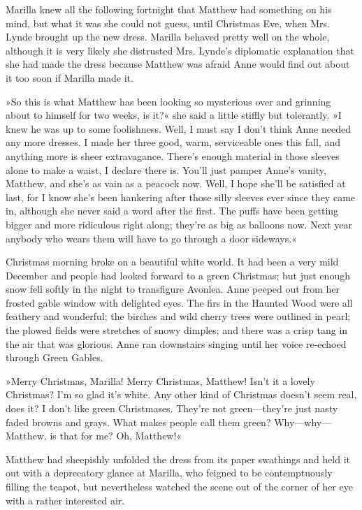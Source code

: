 Marilla knew all the following fortnight that Matthew had something on his mind, but what it was she could not guess, until Christmas Eve, when Mrs. Lynde brought up the new dress. Marilla behaved pretty well on the whole, although it is very likely she distrusted Mrs. Lynde's diplomatic explanation that she had made the dress because Matthew was afraid Anne would find out about it too soon if Marilla made it.

»So this is what Matthew has been looking so mysterious over and grinning about to himself for two weeks, is it?« she said a little stiffly but tolerantly. »I knew he was up to some foolishness. Well, I must say I don't think Anne needed any more dresses. I made her three good, warm, serviceable ones this fall, and anything more is sheer extravagance. There's enough material in those sleeves alone to make a waist, I declare there is. You'll just pamper Anne's vanity, Matthew, and she's as vain as a peacock now. Well, I hope she'll be satisfied at last, for I know she's been hankering after those silly sleeves ever since they came in, although she never said a word after the first. The puffs have been getting bigger and more ridiculous right along; they're as big as balloons now. Next year anybody who wears them will have to go through a door sideways.«

Christmas morning broke on a beautiful white world. It had been a very mild December and people had looked forward to a green Christmas; but just enough snow fell softly in the night to transfigure Avonlea. Anne peeped out from her frosted gable window with delighted eyes. The firs in the Haunted Wood were all feathery and wonderful; the birches and wild cherry trees were outlined in pearl; the plowed fields were stretches of snowy dimples; and there was a crisp tang in the air that was glorious. Anne ran downstairs singing until her voice re-echoed through Green Gables.

»Merry Christmas, Marilla! Merry Christmas, Matthew! Isn't it a lovely Christmas? I'm so glad it's white. Any other kind of Christmas doesn't seem real, does it? I don't like green Christmases. They're not green—they're just nasty faded browns and grays. What makes people call them green? Why—why—Matthew, is that for me? Oh, Matthew!«

Matthew had sheepishly unfolded the dress from its paper swathings and held it out with a deprecatory glance at Marilla, who feigned to be contemptuously filling the teapot, but nevertheless watched the scene out of the corner of her eye with a rather interested air.

